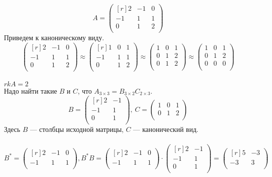 \[A = \begin{pmatrix}[r]
2 & -1 & 0 \\         
-1 & 1 & 1 \\
0 & 1 & 2 \\
\end{pmatrix}\]
Приведем к каноническому виду.\\
\[\begin{pmatrix}[r]
2 & -1 & 0 \\         
-1 & 1 & 1 \\
0 & 1 & 2 \\
\end{pmatrix} \approx \begin{pmatrix}[r]
1 & 0 & 1 \\         
-1 & 1 & 1\\
0 & 1 & 2\\
\end{pmatrix} \approx \begin{pmatrix}
1 & 0 & 1 \\         
0 & 1 & 2 \\
0 & 1 & 2 \\
\end{pmatrix} \approx \begin{pmatrix}
1 & 0 & 1 \\         
0 & 1 & 2 \\
0 & 0 & 0 \\
\end{pmatrix}\]\\
$rkA=2$\\
Надо найти такие $B$ и $C$, что $A_{3 \times 3}=B_{3 \times 2}C_{2 \times 3}$.
\[B = \begin{pmatrix}[r]
2 & -1 \\         
-1 & 1 \\
0 & 1 \\
\end{pmatrix}, ~ C = \begin{pmatrix}
1 & 0 & 1 \\         
0 & 1 & 2 \\
\end{pmatrix}\]
Здесь $B$ --- столбцы исходной матрицы, $C$ --- канонический вид.\\ \\
\[B^* = \begin{pmatrix}[r]
2 & -1 & 0 \\         
-1 & 1 & 1 \\
\end{pmatrix}, B^*B = \begin{pmatrix}[r]
2 & -1 & 0 \\         
-1 & 1 & 1 \\
\end{pmatrix} \cdot \begin{pmatrix}[r]
2 & -1 \\         
-1 & 1 \\
0 & 1 \\
\end{pmatrix} = \begin{pmatrix}[r]
5 & -3 \\         
-3 & 3 \\
\end{pmatrix}\]\\
